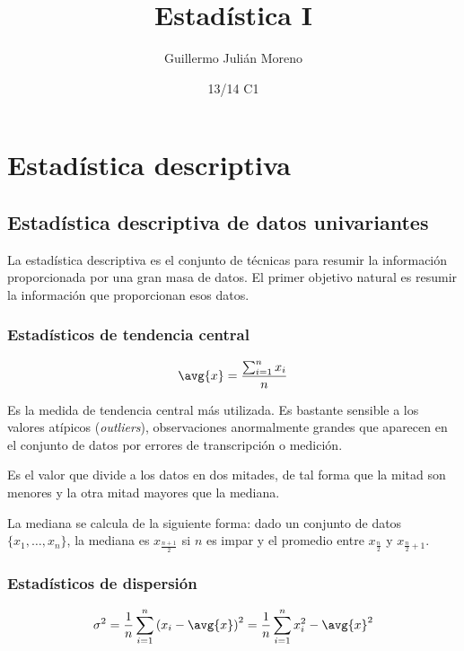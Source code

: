 \documentclass{apuntes}
\author{Guillermo Julián Moreno}
\date{13/14 C1}
\title{Estad\'{i}stica I}
\begin{document}
\pagestyle{plain}
\maketitle

\tableofcontents
\newpage
\chapter{Estadística descriptiva}
\section{Estadística descriptiva de datos univariantes}

La estadística descriptiva es el conjunto de técnicas para resumir la información proporcionada por una gran masa de datos. El primer objetivo natural es resumir la información que proporcionan esos datos.

\subsection{Estadísticos de tendencia central}

\begin{defn}[Media]

\[ \avg{x} = \frac{\sum_{i=1}^n x_i}{n} \]

Es la medida de tendencia central más utilizada. Es bastante sensible a los valores atípicos (\textit{outliers}), observaciones anormalmente grandes que aparecen en el conjunto de datos por errores de transcripción o medición.
\end{defn}

\begin{defn}[Mediana]
Es el valor que divide a los datos en dos mitades, de tal forma que la mitad son menores y la otra mitad mayores que la mediana. 

La mediana se calcula de la siguiente forma: dado un conjunto de datos $\{x_1,\dotsc, x_n\}$, la mediana es $x_{\frac{n+1}{2}}$ si $n$ es impar y  el promedio entre $x_{\frac{n}{2}}$ y $x_{\frac{n}{2} + 1}$.
\end{defn} 

\subsection{Estadísticos de dispersión}

\begin{defn}[Varianza]
\[ \sigma^2 = \frac{1}{n} \sum_{i=1}^n \left(x_i - \avg{x}\right)^2 = \frac{1}{n} \sum_{i=1}^n x_i^2 - \avg{x}^2 \]
\end{defn}
\end{document}
